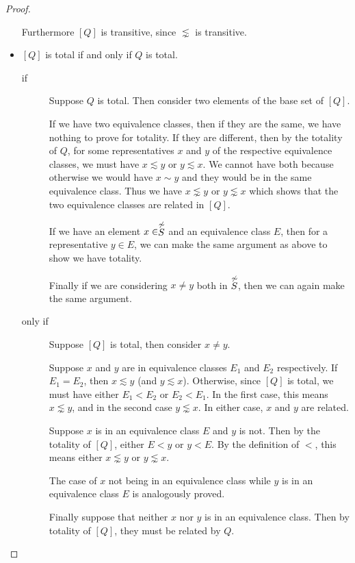\documentclass[12pt]{article}
\theoremstyle{definition}
\theoremstyle{theorem}
\begin{document}
\begin{proof}
\begin{itemize}
    Furthermore $[Q]$ is transitive, since $\lnsim$ is transitive.

  \item $[Q]$ is total if and only if $Q$ is total.
    \begin{description}
    \item[if]  Suppose $Q$ is total.  Then consider two elements of
      the base set of $[Q]$.

      If we have two equivalence classes, then if they are the same,
      we have nothing to prove for totality.  If they are different,
      then by the totality of $Q$, for some representatives $x$ and
      $y$ of the respective equivalence classes,
      we must have $x \lesssim y$ or $y \lesssim x$.  We cannot have
      both because otherwise we would have $x \sim y$ and they would
      be in the same equivalence class.  Thus we have $x \lnsim y$ or
      $y \lnsim x$ which shows that the two equivalence classes are
      related in $[Q]$.

      If we have an element $x \in \stackrel{\not\sim}{S}$ and an equivalence
      class $E$, then for a representative $y \in E$, we can make the
      same argument as above to show we have totality.

      Finally if we are considering \( x \neq y\) both in \(
      \stackrel{\not\sim}{S} \), then
      we can again make the same argument.

    \item[only if]  Suppose $[Q]$ is total, then consider $x\neq y$.

      Suppose $x$ and $y$ are in equivalence classes $E_1$ and $E_2$
      respectively.  If $E_1 = E_2$, then $x \lesssim y$
      (and $y \lesssim x$).  Otherwise, since $[Q]$ is total, we must
      have either $E_1 < E_2$ or $E_2 < E_1$.  In the first case, this
      means $x \lnsim y$, and in the second case $y \lnsim x$.
      In either case, $x$
      and $y$ are related.

      Suppose $x$ is in an equivalence class $E$ and $y$ is not.
      Then by the totality of $[Q]$, either $E < y$ or
      $y < E$.  By the definition of $<$, this means either $x \lnsim
      y$ or \( y \lnsim x\).
      
      The case of $x$ not being in an equivalence class while $y$
      is in an equivalence class $E$ is analogously proved.

      Finally suppose that neither $x$ nor $y$ is in an equivalence
      class.  Then by totality of $[Q]$, they must be related by $Q$.
    \end{description}
  \end{itemize}
\end{proof}
\end{document}
